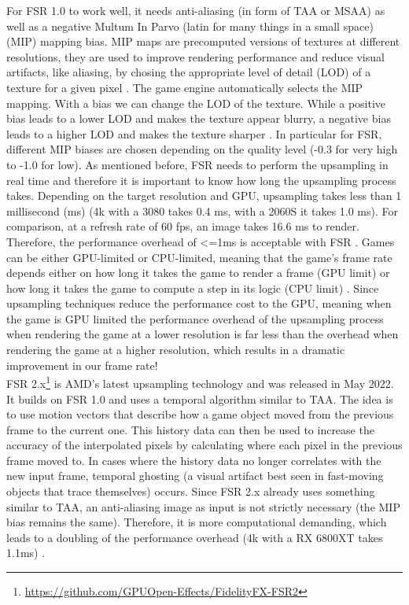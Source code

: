 \documentclass[letterpaper, 10 pt, conference]{ieeeconf}  %
\begin{document}
For FSR 1.0 to work well, it needs anti-aliasing (in form of TAA or MSAA) as well as a negative Multum In Parvo (latin for many things in a small space) (MIP) mapping bias.
MIP maps are precomputed versions of textures at different resolutions, they are used to improve rendering performance and reduce visual artifacts, like aliasing, by chosing the appropriate level of detail (LOD) of a texture for a given pixel \cite{MIP_map}.
The game engine automatically selects the MIP mapping. With a bias we can change the LOD of the texture. While a positive bias leads to a lower LOD and makes the texture appear blurry, a negative bias leads to a higher LOD and makes the texture sharper \cite{MIP_mapBias}.
In particular for FSR, different MIP biases are chosen depending on the quality level (-0.3 for very high to -1.0 for low).
As mentioned before, FSR needs to perform the upsampling in real time and therefore it is important to know how long the upsampling process takes.
Depending on the target resolution and GPU, upsampling takes less than 1 millisecond (ms) (4k with a 3080 takes 0.4 ms, with a 2060S it takes 1.0 ms).
For comparison, at a refresh rate of 60 fps, an image takes 16.6 ms to render. Therefore, the performance overhead of <=1ms is acceptable with FSR \cite{fsr1.0}.
Games can be either GPU-limited or CPU-limited, meaning that the game's frame rate depends either on how long it takes the game to render a frame (GPU limit) or how long it takes the game to compute a step in its logic (CPU limit) \cite{gpu-cpu-limit}.
Since upsampling techniques reduce the performance cost to the GPU, meaning when the game is GPU limited the performance overhead of the upsampling process when rendering the game at a lower resolution is far less than the overhead when rendering the game at a higher resolution, which results in a dramatic improvement in our frame rate!\\
FSR 2.x\footnote{\url{https://github.com/GPUOpen-Effects/FidelityFX-FSR2}} is AMD's latest upsampling technology and was released in May 2022.
It builds on FSR 1.0 and uses a temporal algorithm similar to TAA. The idea is to use motion vectors that describe how a game object moved from the previous frame to the current one.
This history data can then be used to increase the accuracy of the interpolated pixels by calculating where each pixel in the previous frame moved to.
In cases where the history data no longer correlates with the new input frame, temporal ghosting (a visual artifact best seen in fast-moving objects that trace themselves) occurs. 
Since FSR 2.x already uses something similar to TAA, an anti-aliasing image as input is not strictly necessary (the MIP bias remains the same).
Therefore, it is more computational demanding, which leads to a doubling of the performance overhead (4k with a RX 6800XT takes 1.1ms) \cite{fsr2.x}.\\
\end{document}

